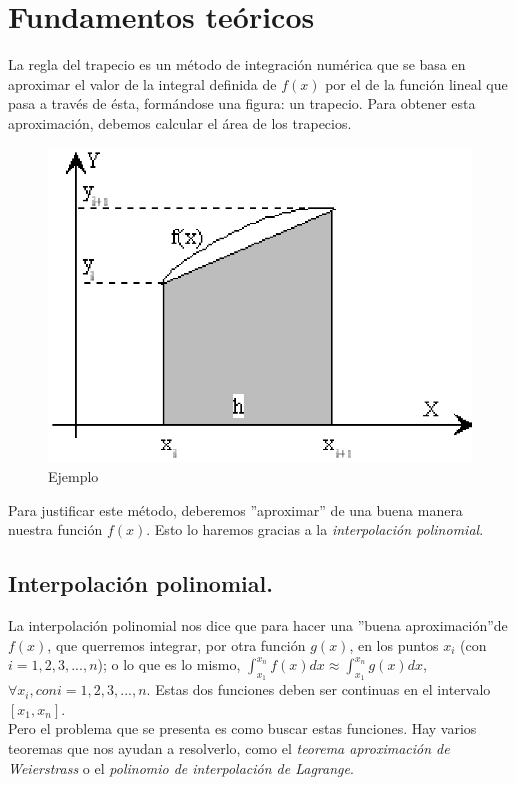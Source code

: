 \documentclass{article}
\begin{document}

  \section{Fundamentos teóricos}
    La regla del trapecio es un método de integración numérica que se basa en aproximar el valor de la integral definida de $f(x)$ por el de la función lineal que pasa a través de ésta, formándose una figura: un trapecio. Para obtener esta aproximación, debemos calcular el área de los trapecios.
    
    \begin{figure}[h]
      \begin{center}
	\includegraphics[scale=0.5]{areadeltrapecio.eps}
	\caption{Ejemplo}
      \end{center}
    \end{figure}

      Para justificar este método, deberemos ''aproximar'' de una buena manera nuestra función $f(x)$. Esto lo haremos gracias a la \textit{interpolación polinomial}.

    \subsection{Interpolación polinomial.}
      La interpolación polinomial nos dice que para hacer una ''buena aproximación''de $f(x)$, que querremos integrar, por otra función $g(x)$, en los puntos $x_{i}$ (con $i = 1, 2, 3, ..., n$); o lo que es lo mismo, $\int_{x_{1}}^{x_{n}}f(x)dx \approx \int_{x_{1}}^{x_{n}}g(x)dx$, $\forall x_{i}, con i = 1, 2, 3, ..., n$. Estas dos funciones deben ser continuas en el intervalo $[x_{1}, x_{n}]$.\\
      Pero el problema que se presenta es como buscar estas funciones. Hay varios teoremas que nos ayudan a resolverlo, como el \textit{teorema aproximación de Weierstrass} o el \textit{polinomio de interpolación de Lagrange}.
      
\end{document}
